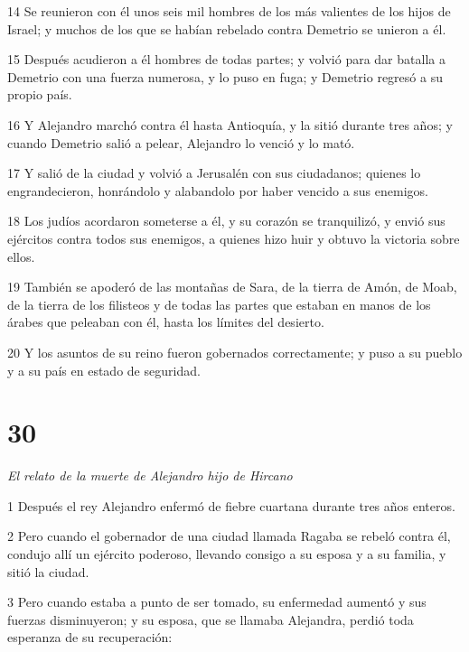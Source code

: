 \par 14 Se reunieron con él unos seis mil hombres de los más valientes de los hijos de Israel; y muchos de los que se habían rebelado contra Demetrio se unieron a él.

\par 15 Después acudieron a él hombres de todas partes; y volvió para dar batalla a Demetrio con una fuerza numerosa, y lo puso en fuga; y Demetrio regresó a su propio país.

\par 16 Y Alejandro marchó contra él hasta Antioquía, y la sitió durante tres años; y cuando Demetrio salió a pelear, Alejandro lo venció y lo mató.

\par 17 Y salió de la ciudad y volvió a Jerusalén con sus ciudadanos; quienes lo engrandecieron, honrándolo y alabandolo por haber vencido a sus enemigos.

\par 18 Los judíos acordaron someterse a él, y su corazón se tranquilizó, y envió sus ejércitos contra todos sus enemigos, a quienes hizo huir y obtuvo la victoria sobre ellos.

\par 19 También se apoderó de las montañas de Sara, de la tierra de Amón, de Moab, de la tierra de los filisteos y de todas las partes que estaban en manos de los árabes que peleaban con él, hasta los límites del desierto.

\par 20 Y los asuntos de su reino fueron gobernados correctamente; y puso a su pueblo y a su país en estado de seguridad.

\chapter{30}

\par \textit{El relato de la muerte de Alejandro hijo de Hircano}

\par 1 Después el rey Alejandro enfermó de fiebre cuartana durante tres años enteros.

\par 2 Pero cuando el gobernador de una ciudad llamada Ragaba se rebeló contra él, condujo allí un ejército poderoso, llevando consigo a su esposa y a su familia, y sitió la ciudad.

\par 3 Pero cuando estaba a punto de ser tomado, su enfermedad aumentó y sus fuerzas disminuyeron; y su esposa, que se llamaba Alejandra, perdió toda esperanza de su recuperación:

